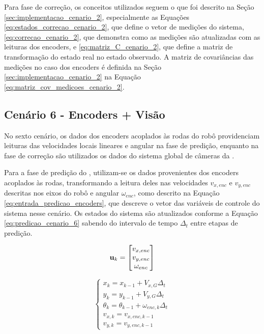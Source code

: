 \documentclass[acronym, symbols, table, deposito]{fei}
\begin{document}
			Para fase de correção, os conceitos utilizados seguem o que foi descrito na Seção \ref{sec:implementacao_cenario_2}, especialmente as Equações \eqref{eq:estados_correcao_cenario_2}, que define o vetor de medições do sistema, \eqref{eq:correcao_cenario_2}, que demonstra como as medições são atualizadas com as leituras dos encoders, e \eqref{eq:matriz_C_cenario_2}, que define a matriz de transformação do estado real no estado observado. A matriz de covariâncias das medições no caso dos encoders é definida na Seção \ref{sec:implementacao_cenario_2} na Equação \eqref{eq:matriz_cov_medicoes_cenario_2}.
			
		\subsection{Cenário 6 - Encoders + Visão} \label{sec:implementacao_cenario_6}
			
			No sexto cenário, os dados dos encoders acoplados às rodas do robô providenciam leituras das velocidades locais lineares e angular na fase de predição, enquanto na fase de correção são utilizados os dados do sistema global de câmeras da .
			
			Para a fase de predição do , utilizam-se os dados provenientes dos encoders acoplados às rodas, transformando a leitura deles nas velocidades $v_{x,enc}$ e $v_{y,enc}$ descritas nos eixos do robô e angular $\omega_{enc}$, como descrito na Equação \eqref{eq:entrada_predicao_encoders}, que descreve o vetor das variáveis de controle do sistema nesse cenário. Os estados do sistema são atualizados conforme a Equação \eqref{eq:predicao_cenario_6} sabendo do intervalo de tempo $\Delta_t$ entre etapas de predição.
			
			\begin{equation}\label{eq:entrada_predicao_encoders}
				\text{\textbf{u}}_k =
				\begin{bmatrix}
					v_{x,enc} \\
					v_{y,enc} \\
					\omega_{enc}
				\end{bmatrix}
			\end{equation}
		
			\begin{equation}\label{eq:predicao_cenario_6}
				\begin{cases}
					x_{k} = x_{k-1} + V_{x,G} \Delta_t \\
					y_{k} = y_{k-1} + V_{y,G} \Delta_t \\
					\theta_{k} = \theta_{k-1} + \omega_{enc,k} \Delta_t \\
					v_{x,k} = v_{x,enc,k-1} \\
					v_{y,k} = v_{y,enc,k-1}
				\end{cases}
			\end{equation}
			
\end{document}

